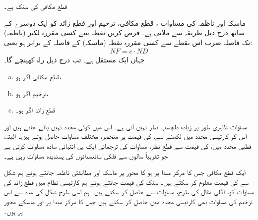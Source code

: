 قطع مکافی کی سنک  ہے۔

ماسکہ اور ناظمہ کی مساوات ، قطع مکافی، ترخیم اور قطع زائد کو ایک دوسرے کے ساتھ درج ذیل طریقہ سے ملاتی ہے۔ فرض کریں نقطہ  سے کسی مقررہ لکیر (ناظمہ) تک فاصلہ ضرب  اس نقطے  سے کسی مقررہ نقطہ  (ماسکہ) کے فاصلہ کے برابر ہو یعنی:
\begin{align}\label{مساوات_مخروط_سنکی_تعلق} 
NF=e\cdot ND
\end{align}
جہاں  ایک مستقل ہے۔ تب  درج ذیل راہ کھینچے گا۔
\begin{enumerate}[a.]
\item
قطع مکافی اگر  ہو،
\item
ترخیم اگر  ہو،
\item
قطع زائد اگر  ہو۔
\end{enumerate} 

مساوات  ظاہری طور پر زیادہ دلچسپ نظر نہیں آتی ہے۔ اس میں کوئی محدد نہیں پائے جاتے ہیں اور اس کو کارتیسی محدد میں لکھنے سے،  کی قیمت پر منحصر، مختلف مساوات حاصل ہوتے ہیں۔ البتہ، قطبی محدد میں،  کی قیمت سے قطع نظر، مساوات  کی ترجمانی ایک ہی انتہائی سادہ مساوات کرتی ہے جو تقریباً  سالوں سے  فلکی سائنسدانوں  کی پسندیدہ مساوات رہی ہے۔

ایک قطع مکافی جس کا مرکز مبدا پر ہو کا  محور پر ماسکہ اور مطابقتی ناظمہ جانتے ہوئے ہم شکل سے  کی قیمت معلوم کر سکتے ہیں۔ سنک  کی قیمت جانتے ہوئے ہم کارتیسی نظام میں  قطع زائد کی مساوات کو، اگلی مثال کی طرح، مساوات  سے  حاصل کر سکتے ہیں۔ ہم اسی طرح شکل  کی مدد سے  اس ترخیم کی مساوات بھی کارتیسی محدد میں حاصل کر سکتے ہیں جس کا مرکز مبدا پر اور ماسکے  محور پر ہوں۔

